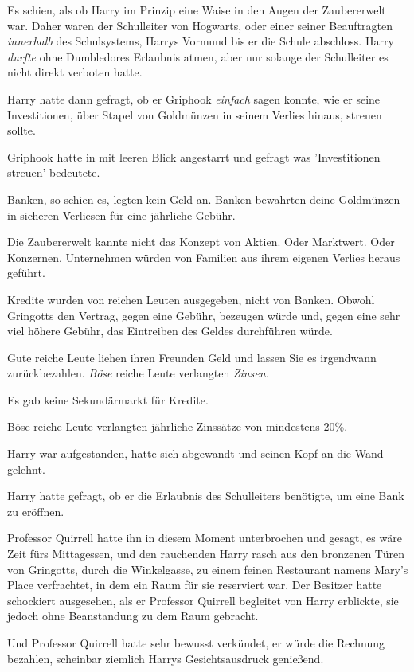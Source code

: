 {Es schien, als ob Harry im Prinzip eine Waise in den Augen der Zaubererwelt war. Daher waren der Schulleiter von Hogwarts, oder einer seiner Beauftragten \emph{innerhalb} des Schulsystems, Harrys Vormund bis er die Schule abschloss. Harry \emph{durfte} ohne Dumbledores Erlaubnis atmen, aber nur solange der Schulleiter es nicht direkt verboten hatte.

Harry hatte dann gefragt, ob er Griphook \emph{einfach} sagen konnte, wie er seine Investitionen, über Stapel von Goldmünzen in seinem Verlies hinaus, streuen sollte.

Griphook hatte in mit leeren Blick angestarrt und gefragt was 'Investitionen streuen' bedeutete.

Banken, so schien es, legten kein Geld an. Banken bewahrten deine Goldmünzen in sicheren Verliesen für eine jährliche Gebühr.

Die Zaubererwelt kannte nicht das Konzept von Aktien. Oder Marktwert. Oder Konzernen. Unternehmen würden von Familien aus ihrem eigenen Verlies heraus geführt.

Kredite wurden von reichen Leuten ausgegeben, nicht von Banken. Obwohl Gringotts den Vertrag, gegen eine Gebühr, bezeugen würde und, gegen eine sehr viel höhere Gebühr, das Eintreiben des Geldes durchführen würde.

Gute reiche Leute liehen ihren Freunden Geld und lassen Sie es irgendwann zurückbezahlen. \emph{Böse} reiche Leute verlangten \emph{Zinsen.}

Es gab keine Sekundärmarkt für Kredite.

Böse reiche Leute verlangten jährliche Zinssätze von mindestens 20\%.

Harry war aufgestanden, hatte sich abgewandt und seinen Kopf an die Wand gelehnt.

Harry hatte gefragt, ob er die Erlaubnis des Schulleiters benötigte, um eine Bank zu eröffnen.

Professor Quirrell hatte ihn in diesem Moment unterbrochen und gesagt, es wäre Zeit fürs Mittagessen, und den rauchenden Harry rasch aus den bronzenen Türen von Gringotts, durch die Winkelgasse, zu einem feinen Restaurant namens Mary's Place verfrachtet, in dem ein Raum für sie reserviert war. Der Besitzer hatte schockiert ausgesehen, als er Professor Quirrell begleitet von Harry erblickte, sie jedoch ohne Beanstandung zu dem Raum gebracht.

Und Professor Quirrell hatte sehr bewusst verkündet, er würde die Rechnung bezahlen, scheinbar ziemlich Harrys Gesichtsausdruck genießend.

}
